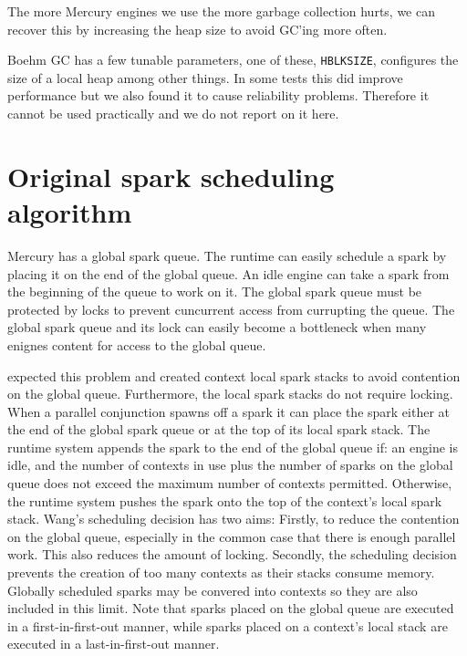 The more Mercury engines we use the more garbage collection hurts,
we can recover this by increasing the heap size to avoid GC'ing more often.


Boehm GC has a few tunable parameters, one of these, \texttt{HBLKSIZE},
configures the size of a local heap among other things.
In some tests this did improve performance but we also found it to cause
reliability problems.
Therefore it cannot be used practically and we do not report on it here.


\section{Original spark scheduling algorithm}
\label{sec:old_scheduling}


Mercury has a global spark queue.
The runtime can easily schedule a spark by placing it on the end of the
global queue.
An idle engine can take a spark from the beginning of the queue to work on
it.
The global spark queue must be protected by locks to prevent cuncurrent
access from currupting the queue.
The global spark queue and its lock can easily become a bottleneck when many
enignes content for access to the global queue.

\citet{wang-hons} expected this problem and created context local spark stacks
to avoid contention on the global queue.
Furthermore, the local spark stacks do not require locking.
When a parallel conjunction spawns off a spark it can place the spark either
at the end of the global spark queue or at the top of its local spark stack.
The runtime system appends the spark to the end of the global queue if:
an engine is idle, and
the number of contexts in use plus the number of sparks on the global queue
does not exceed the maximum number of contexts permitted.
Otherwise,
the runtime system pushes the spark onto the top of the context's local
spark stack.
Wang's scheduling decision has two aims:
Firstly, to reduce the contention on the global queue,
especially in the common case that there is enough parallel work.
This also reduces the amount of locking.
Secondly, the scheduling decision prevents the creation of too many contexts
as their stacks consume memory.
Globally scheduled sparks may be convered into contexts so they are also
included in this limit.
Note that sparks placed on the global queue are executed in a
first-in-first-out manner, while
sparks placed on a context's local stack are executed in a
last-in-first-out manner.

